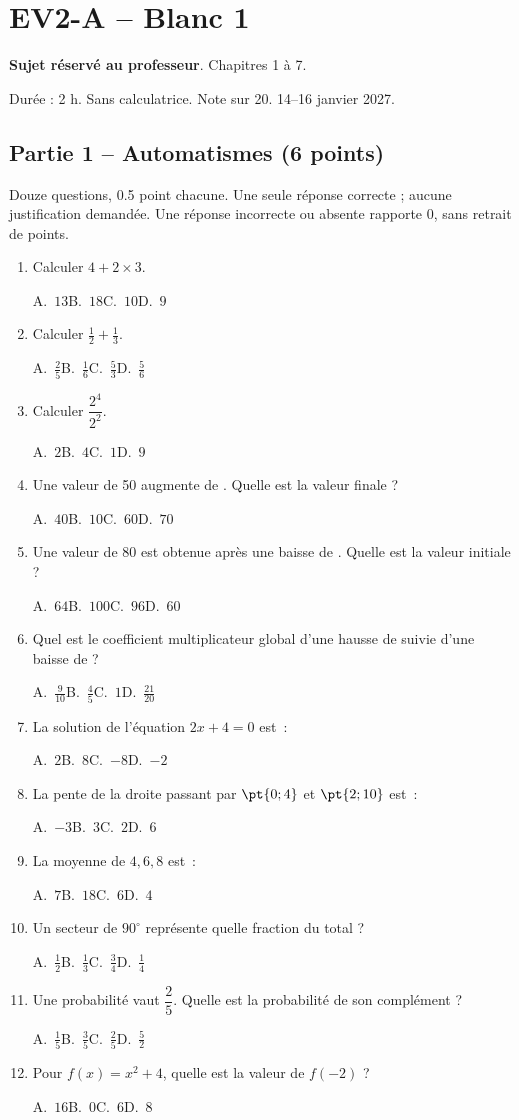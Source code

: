 \mxnewpage\section*{EV2-A -- Blanc 1}\label{EV2-A}
\textbf{Sujet réservé au professeur}. Chapitres 1 à 7.\par Durée : 2 h. Sans calculatrice. Note sur 20. 14–16 janvier 2027.
\subsection*{Partie 1 -- Automatismes (6 points)}
Douze questions, \num{0,5} point chacune. Une seule réponse correcte ; aucune justification demandée. Une réponse incorrecte ou absente rapporte 0, sans retrait de points.
\begin{enumerate}
\item Calculer $4+2\times3$.\par A.~$13$\quad B.~$18$\quad C.~$10$\quad D.~$9$
\item Calculer $\frac12+\frac13$.\par A.~$\frac{2}{5}$\quad B.~$\frac{1}{6}$\quad C.~$\frac{5}{3}$\quad D.~$\frac{5}{6}$
\item Calculer $\dfrac{2^4}{2^{2}}$.\par A.~$2$\quad B.~$4$\quad C.~$1$\quad D.~$9$
\item Une valeur de 50 augmente de . Quelle est la valeur finale ?\par A.~$40$\quad B.~$10$\quad C.~$60$\quad D.~$70$
\item Une valeur de 80 est obtenue après une baisse de . Quelle est la valeur initiale ?\par A.~$64$\quad B.~$100$\quad C.~$96$\quad D.~$60$
\item Quel est le coefficient multiplicateur global d'une hausse de  suivie d'une baisse de  ?\par A.~$\frac{9}{10}$\quad B.~$\frac{4}{5}$\quad C.~$1$\quad D.~$\frac{21}{20}$
\item La solution de l'équation $2x+4=0$ est~:\par A.~$2$\quad B.~$8$\quad C.~$-8$\quad D.~$-2$
\item La pente de la droite passant par $\pt{0;4}$ et $\pt{2;10}$ est~:\par A.~$-3$\quad B.~$3$\quad C.~$2$\quad D.~$6$
\item La moyenne de $4, 6, 8$ est~:\par A.~$7$\quad B.~$18$\quad C.~$6$\quad D.~$4$
\item Un secteur de $90^\circ$ représente quelle fraction du total ?\par A.~$\frac{1}{2}$\quad B.~$\frac{1}{3}$\quad C.~$\frac{3}{4}$\quad D.~$\frac{1}{4}$
\item Une probabilité vaut $\dfrac{2}{5}$. Quelle est la probabilité de son complément ?\par A.~$\frac{1}{5}$\quad B.~$\frac{3}{5}$\quad C.~$\frac{2}{5}$\quad D.~$\frac{5}{2}$
\item Pour $f(x)=x^2+4$, quelle est la valeur de $f(-2)$ ?\par A.~$16$\quad B.~$0$\quad C.~$6$\quad D.~$8$
\end{enumerate}
